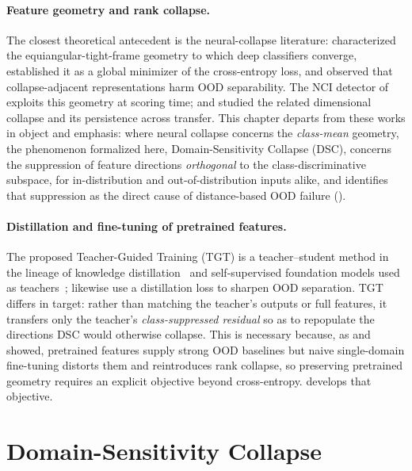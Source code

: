 \paragraph{Feature geometry and rank collapse.}
The closest theoretical antecedent is the neural-collapse literature: \citet{Papyan2020nc} characterized the equiangular-tight-frame geometry to which deep classifiers converge, \citet{Zhu2021nc} established it as a global minimizer of the cross-entropy loss, and \citet{Haas2022ncood} observed that collapse-adjacent representations harm OOD separability. The NCI detector of \citet{liu2025detecting} exploits this geometry at scoring time; \citet{Jing2022rank} and \citet{Galanti2022collapse} studied the related dimensional collapse and its persistence across transfer. This chapter departs from these works in object and emphasis: where neural collapse concerns the \emph{class-mean} geometry, the phenomenon formalized here, Domain-Sensitivity Collapse (DSC), concerns the suppression of feature directions \emph{orthogonal} to the class-discriminative subspace, for in-distribution and out-of-distribution inputs alike, and identifies that suppression as the direct cause of distance-based OOD failure ().

\paragraph{Distillation and fine-tuning of pretrained features.}
The proposed Teacher-Guided Training (TGT) is a teacher--student method in the lineage of knowledge distillation~\citep{hinton2015distilling} and self-supervised foundation models used as teachers~\citep{Caron2021dino,oquab2023dinov2,Touvron2021deit}; \citet{Yang2025pskd} likewise use a distillation loss to sharpen OOD separation. TGT differs in target: rather than matching the teacher's outputs or full features, it transfers only the teacher's \emph{class-suppressed residual} so as to repopulate the directions DSC would otherwise collapse. This is necessary because, as \citet{fort2021exploring} and \citet{Kumar2022lp} showed, pretrained features supply strong OOD baselines but naive single-domain fine-tuning distorts them and reintroduces rank collapse, so preserving pretrained geometry requires an explicit objective beyond cross-entropy.  develops that objective.

\section{Domain-Sensitivity Collapse}
\label{sec:dsc:phenomenon}

